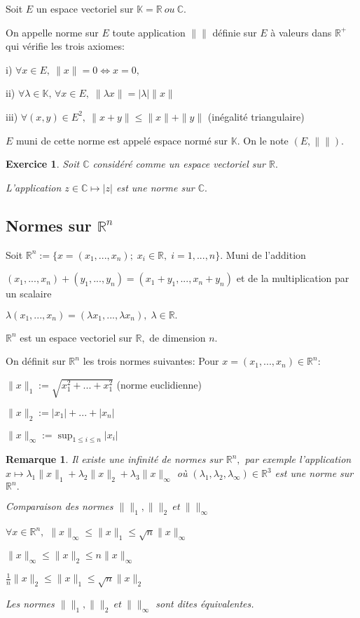 \documentclass[11pt,a4paper]{report}
\newtheorem{remarque}{Remarque}[section]
\newtheorem{exo}{Exercice}[section]
\begin{document}
Soit $E$ un espace vectoriel sur $\mathbb{K}=\mathbb{R}\:ou\:\mathbb{C}.$

On appelle norme sur $E$ toute application $\|\|$ définie sur $E$ à valeurs dans $\mathbb{R}^{+}$ qui vérifie les trois axiomes:

i) $\forall x\in E,\:\|x\|=0\Leftrightarrow x=0,$

ii) $\forall \lambda\in \mathbb{K},\, \forall x\in E,\; \|\lambda x\|=|\lambda|\|x\|$

iii) $\forall (x,y)\in E^2,\:\|x+y\|\leq\|x\|+\|y\|$ (inégalité triangulaire)

$E$ muni de cette norme est appelé espace normé sur $\mathbb{K}.$ On le note $(E,\|\|).$

\begin{exo}
Soit $\mathbb{C}$ considéré comme un espace vectoriel sur $\mathbb{R}.$

L'application $z\in \mathbb{C}\mapsto|z|$ est une norme sur $\mathbb{C}.$
\end{exo}

\subsection{Normes sur $\mathbb{R}^n$}

Soit $\mathbb{R}^n:=\{x=(x_1,...,x_n);\;x_i\in\mathbb{R},\;i=1,...,n\}.$ Muni de l'addition

$(x_1,...,x_n)+(y_1,...,y_n)=(x_1+y_1,...,x_n+y_n)$ et de la multiplication par un scalaire

$\lambda(x_1,...,x_n)=(\lambda x_1,...,\lambda x_n),\;\lambda\in \mathbb{R}.$

$\mathbb{R}^n$ est un espace vectoriel sur $\mathbb{R},$ de dimension $n.$

On définit sur $\mathbb{R}^n$ les trois normes suivantes: Pour $x=(x_1,...,x_n)\in \mathbb{R}^n:$

$\|x\|_1:=\sqrt{x_{1}^{2}+...+x_{1}^{2}}$ (norme euclidienne)

$\|x\|_2:=|x_1|+...+|x_n|$

$\|x\|_{\infty}:=\sup_{1\leq i\leq n}|x_i|$

\begin{remarque}
Il existe une infinité de normes sur $\mathbb{R}^n,$ par exemple l'application $x\mapsto\lambda_1 \|x\|_1+\lambda_2\|x\|_2+\lambda_3\|x\|_{\infty}$ où $(\lambda_1,\lambda_2,\lambda_{\infty})\in \mathbb{R}^3$ est une norme sur $\mathbb{R}^n.$

Comparaison des normes $\| \|_1,\| \|_2\: et\:\| \|_{\infty}$

$\forall x\in \mathbb{R}^n,$ $\|x\|_{\infty}\leq \|x\|_1\leq\sqrt{n}\|x\|_{\infty}$

$\|x\|_{\infty}\leq \|x\|_2\leq n\|x\|_{\infty}$

$\frac{1}{n}\|x\|_2\leq\|x\|_1\leq\sqrt{n}\|x\|_2$

Les normes $\| \|_1,\| \|_2\: et\:\| \|_{\infty}$ sont dites équivalentes.
\end{remarque}
\end{document}
